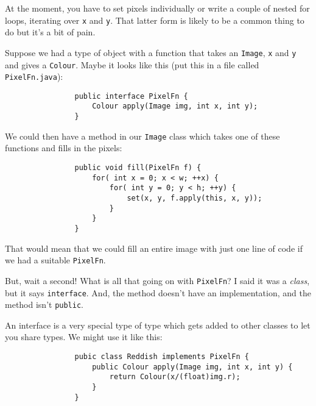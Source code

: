 \documentclass{article}
\begin{document}
            At the moment, you have to set pixels individually or write a couple of nested for loops, iterating over \texttt{x} and
            \texttt{y}.  That latter form is likely to be a common thing to do but it's a bit of pain.  
            
            Suppose we had a type of object with a function that takes an \texttt{Image}, \texttt{x} and \texttt{y} and gives a
            \texttt{Colour}. Maybe it looks like this (put this in a file called \texttt{PixelFn.java}):
        
            \begin{verbatim}
                public interface PixelFn {
                    Colour apply(Image img, int x, int y);
                }
            \end{verbatim}
            
            We could then have a method in our \texttt{Image} class which takes one of these functions and fills in the pixels:

            \begin{verbatim}
                public void fill(PixelFn f) {
                    for( int x = 0; x < w; ++x) {
                        for( int y = 0; y < h; ++y) {
                            set(x, y, f.apply(this, x, y));
                        }
                    }
                }
            \end{verbatim}
            
            That would mean that we could fill an entire image with just one line of code if we had a suitable \texttt{PixelFn}.
            
            But, wait a second! What is all that going on with \texttt{PixelFn}? I said it was a \emph{class}, but it says
            \texttt{interface}. And, the method doesn't have an implementation, and the method isn't \texttt{public}.
            
            An interface is a very special type of type which gets added to other classes to let you share types. We might use it like this:

            \begin{verbatim}
                pubic class Reddish implements PixelFn {
                    public Colour apply(Image img, int x, int y) {
                        return Colour(x/(float)img.r);
                    }
                }
            \end{verbatim}
            
\end{document}
